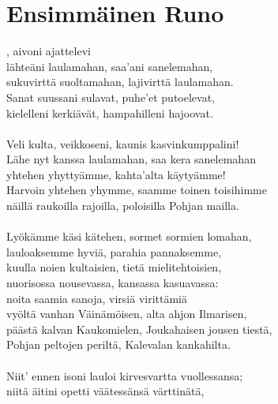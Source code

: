 
\chapter*{Ensimmäinen Runo}

, aivoni ajattelevi          \\
lähteäni laulamahan, saa'ani sanelemahan,				          	\\	
sukuvirttä suoltamahan, lajivirttä laulamahan.              \\
Sanat suussani sulavat, puhe'et putoelevat,                 \\
kielelleni kerkiävät, hampahilleni hajoovat.                \\
                                                            \\
Veli kulta, veikkoseni, kaunis kasvinkumppalini!            \\
Lähe nyt kanssa laulamahan, saa kera sanelemahan            \\
yhtehen yhyttyämme, kahta'alta käytyämme!                   \\
Harvoin yhtehen yhymme, saamme toinen toisihimme            \\
näillä raukoilla rajoilla, poloisilla Pohjan mailla.        \\
                                                            \\
Lyökämme käsi kätehen, sormet sormien lomahan,              \\
lauloaksemme hyviä, parahia pannaksemme,                    \\
kuulla noien kultaisien, tietä mielitehtoisien,             \\
nuorisossa nousevassa, kansassa kasuavassa:                 \\
noita saamia sanoja, virsiä virittämiä                      \\
vyöltä vanhan Väinämöisen, alta ahjon Ilmarisen,            \\
päästä kalvan Kaukomielen, Joukahaisen jousen tiestä,       \\
Pohjan peltojen periltä, Kalevalan kankahilta.              \\
                                                            \\
Niit' ennen isoni lauloi kirvesvartta vuollessansa;         \\
niitä äitini opetti väätessänsä värttinätä,                 \\
